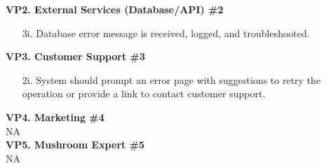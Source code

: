 \documentclass[]{article}
\begin{document}
\begin{enumerate}[{\bf BE1.}]
\begin{enumerate}[{\bf BE2.}]
{\begin{enumerate}
\begin{enumerate}
	        \end{enumerate}
	    \end{enumerate}
	    }
	    \textbf{VP2. External Services (Database/API) \#2}
	    {\color{red}
	        \begin{enumerate}
	        \item[3i.] Database error message is received, logged, and troubleshooted.
	    \end{enumerate}
	    }
	    \textbf{VP3. Customer Support \#3}
	        {\color{red}
	        \begin{enumerate}
	        \item[2i.] System should prompt an error page with suggestions to retry the operation or provide a link to contact customer support.\\
	    \end{enumerate}
	    }
	    \textbf{VP4. Marketing \#4}\\
	    NA\\[1mm]
	    
	    \textbf{VP5. Mushroom Expert \#5}\\
	    NA\\[1mm]
	    

\end{enumerate}
\end{enumerate}
\end{document}
